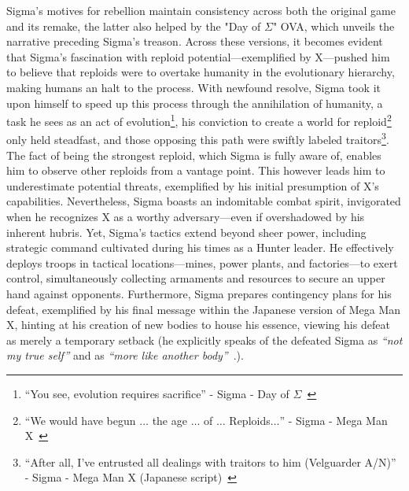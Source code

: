Sigma's motives for rebellion maintain consistency across both the original game and its remake, the latter also helped by the "Day of $\Sigma$" OVA, which unveils the narrative preceding Sigma's treason. Across these versions, it becomes evident that Sigma's fascination with reploid potential—exemplified by X—pushed him to believe that reploids were to overtake humanity in the evolutionary hierarchy, making humans an halt to the process. With newfound resolve, Sigma took it upon himself to speed up this process through the annihilation of humanity, a task he sees as an act of evolution\footnote{\enquote{You see, evolution requires sacrifice} - Sigma - Day of $\Sigma$~\cite{wiki:Day_of_Sigma_Script}}, his conviction to create a world for reploid\footnote{\enquote{We would have begun $\dots$ the age $\dots$ of $\dots$ Reploids$\dots$} - Sigma - Mega Man X~\cite{wiki:MMX_script}} only held steadfast, and those opposing this path were swiftly labeled traitors\footnote{\enquote{After all, I’ve entrusted all dealings with traitors to him (Velguarder A/N)} - Sigma - Mega Man X (Japanese script)~\cite{wordpress:X_japanese_script}}. The fact of being the strongest reploid, which Sigma is fully aware of, enables him to observe other reploids from a vantage point. This however leads him to underestimate potential threats, exemplified by his initial presumption of X's capabilities. Nevertheless, Sigma boasts an indomitable combat spirit, invigorated when he recognizes X as a worthy adversary—even if overshadowed by his inherent hubris. Yet, Sigma's tactics extend beyond sheer power, including strategic command cultivated during his times as a Hunter leader. He effectively deploys troops in tactical locations—mines, power plants, and factories—to exert control, simultaneously collecting armaments and resources to secure an upper hand against opponents. Furthermore, Sigma prepares contingency plans for his defeat, exemplified by his final message within the Japanese version of Mega Man X, hinting at his creation of new bodies to house his essence, viewing his defeat as merely a temporary setback (he explicitly speaks of the defeated Sigma as \textit{``not my true self''} and as \textit{``more like another body''}~\cite{wordpress:X_japanese_script}.).


